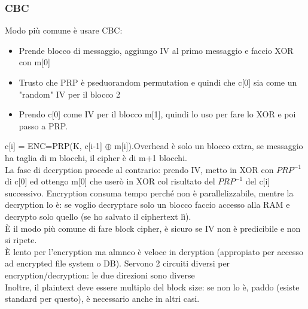 \documentclass[16px]{article}
\begin{document}
\subsubsection{CBC}
Modo più comune è usare CBC:
\begin{itemize}
\item Prende blocco di messaggio, aggiungo IV al primo messaggio e faccio XOR con m[0]
\item Trusto che PRP è pseduorandom permutation e quindi che c[0] sia come un "random" IV per il blocco 2
\item Prendo c[0] come IV per il blocco m[1], quindi lo uso per fare lo XOR e poi passo a PRP.
\end{itemize}
c[i] = ENC=PRP(K, c[i-1] $\oplus$ m[i]).Overhead è solo un blocco extra, se messaggio ha taglia di m blocchi, il cipher è di m+1 blocchi.\\ La fase di decryption procede al contrario: prendo IV, metto in XOR con $PRP^{-1}$ di c[0] ed ottengo m[0] che userò in XOR col risultato del $PRP^{-1}$ del c[i] successivo. Encryption consuma tempo perché non è parallelizzabile, mentre la decryption lo è: se voglio decryptare solo un blocco faccio accesso alla RAM e decrypto solo quello (se ho salvato il ciphertext lì).\\ È il modo più comune di fare block cipher, è sicuro se IV non è predicibile e non si ripete.\\ È lento per l'encryption ma almneo è veloce in deryption (appropiato per accesso ad encrypted file system o DB). Servono 2 circuiti diversi per encryption/decryption: le due direzioni sono diverse\\ Inoltre, il plaintext deve essere multiplo del block size: se non lo è, paddo (esiste standard per questo), è necessario anche in altri casi.
\end{document}
